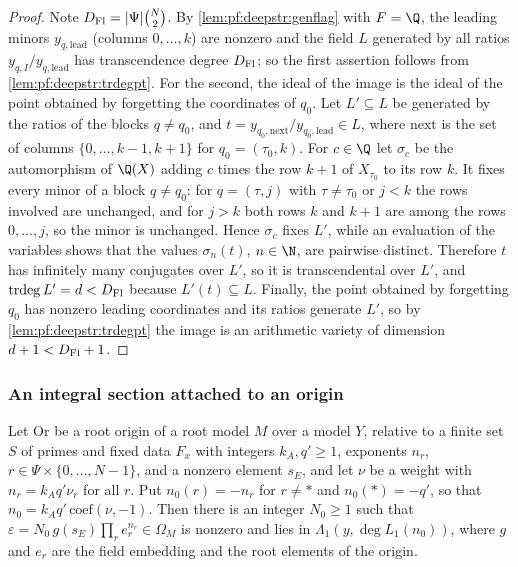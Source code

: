 \begin{proof}
Note $D_{\mathrm{Fl}}=|\Psi|\binom N2$. By \cref{lem:pf:deepstr:genflag} with $F=\Q$, the leading minors $y_{q,\mathrm{lead}}$
(columns $0,\dots,k$) are nonzero and the field $L$ generated by all ratios $y_{q,I}/y_{q,\mathrm{lead}}$ has transcendence
degree $D_{\mathrm{Fl}}$; so the first assertion follows from \cref{lem:pf:deepstr:trdegpt}. For the second, the ideal of the
image is the ideal of the point obtained by forgetting the coordinates of $q_0$. Let $L'\subseteq L$ be generated by the
ratios of the blocks $q\ne q_0$, and $t=y_{q_0,\mathrm{next}}/y_{q_0,\mathrm{lead}}\in L$, where $\mathrm{next}$ is the set of columns
$\{0,\dots,k-1,k+1\}$ for $q_0=(\tau_0,k)$. For $c\in\Q$ let $\sigma_c$ be the automorphism of $\Q(X)$ adding $c$ times the
row $k+1$ of $X_{\tau_0}$ to its row $k$. It fixes every minor of a block $q\ne q_0$: for $q=(\tau,j)$ with $\tau\ne\tau_0$ or
$j<k$ the rows involved are unchanged, and for $j>k$ both rows $k$ and $k+1$ are among the rows $0,\dots,j$, so the
minor is unchanged. Hence $\sigma_c$ fixes $L'$, while an evaluation of the variables shows that the values
$\sigma_n(t)$, $n\in\N$, are pairwise distinct. Therefore $t$ has infinitely many conjugates over $L'$, so it is
transcendental over $L'$, and $\operatorname{trdeg}L'=d<D_{\mathrm{Fl}}$ because $L'(t)\subseteq L$. Finally, the point
obtained by forgetting $q_0$ has nonzero leading coordinates and its ratios generate $L'$, so by \cref{lem:pf:deepstr:trdegpt}
the image is an arithmetic variety of dimension $d+1<D_{\mathrm{Fl}}+1$.
\end{proof}

\subsubsection*{An integral section attached to an origin}

\begin{proposition}\label{prop:pf:deepstr:weightsection}
Let $\mathrm{Or}$ be a root origin of a root model $M$ over a model $Y$, relative to a finite set $S$ of primes and
fixed data $F_x$ with integers $k_A,q'\ge1$, exponents $n_r$, $r\in\Psi\times\{0,\dots,N-1\}$, and a nonzero element $s_E$, and
let $\nu$ be a weight with $n_r=k_Aq'\nu_r$ for all $r$. Put $n_0(r)=-n_r$ for $r\ne\ast$ and $n_0(\ast)=-q'$, so that
$n_0=k_Aq'\,\mathrm{coef}(\nu,-1)$. Then there is an integer $N_0\ge1$ such that
$\varepsilon=N_0\,g(s_E)\prod_re_r^{n_r}\in\Omega_M$ is nonzero and lies in $\Lambda_1(y,\deg L_1(n_0))$, where $g$ and $e_r$ are the field
embedding and the root elements of the origin.
\end{proposition}

